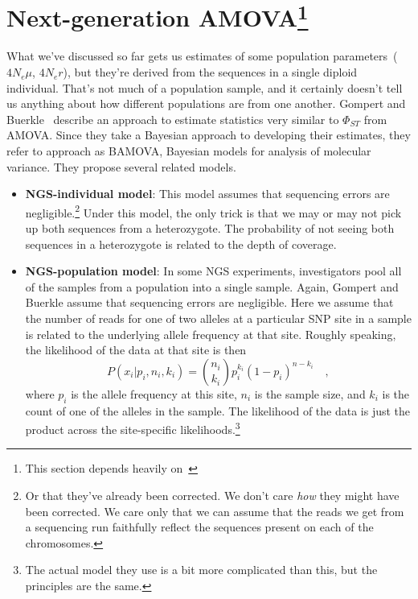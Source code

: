\documentclass[12pt]{article}
\begin{document}
\section*{Next-generation AMOVA\footnote{This section depends heavily on~\cite{Gompert-Buerkle-2011}}}

What we've discussed so far gets us estimates of some population
parameters~($4N_e\mu$, $4N_er$), but they're derived from the
sequences in a single diploid individual. That's not much of a
population sample, and it certainly doesn't tell us anything about how
different populations are from one another. Gompert and
Buerkle~\cite{Gompert-Buerkle-2011} describe an approach to estimate
statistics very similar to $\Phi_{ST}$ from AMOVA. Since they take a
Bayesian approach to developing their estimates, they refer to
approach as BAMOVA, Bayesian models for analysis of molecular
variance. They propose several related models.

\begin{itemize}

\item {\bf NGS-individual model}: This model assumes that sequencing
  errors are negligible.\footnote{Or that they've already been
    corrected. We don't care {\it how\/} they might have been
    corrected. We care only that we can assume that the reads we get
    from a sequencing run faithfully reflect the sequences present on
    each of the chromosomes.} Under this model, the only trick is that
  we may or may not pick up both sequences from a heterozygote. The
  probability of not seeing both sequences in a heterozygote is
  related to the depth of coverage.

\item {\bf NGS-population model}: In some NGS experiments,
  investigators pool all of the samples from a population into a
  single sample. Again, Gompert and Buerkle assume that sequencing
  errors are negligible. Here we assume that the number of reads for
  one of two alleles at a particular SNP site in a sample is related
  to the underlying allele frequency at that site. Roughly speaking,
  the likelihood of the data at that site is then
\[
P(x_i|p_i,n_i, k_i) = {n_i \choose k_i}p_i^{k_i}(1-p_{i})^{n-k_i}
\quad ,
\]
where $p_i$ is the allele frequency at this site, $n_i$ is the sample
size, and $k_i$ is the count of one of the alleles in the sample. The
likelihood of the data is just the product across the site-specific
likelihoods.\footnote{The actual model they use is a bit more
  complicated than this, but the principles are the same.}

\end{itemize}
\end{document}
